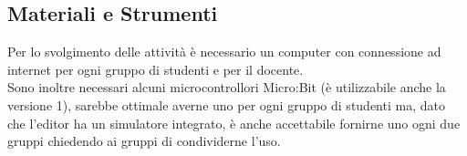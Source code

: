 \documentclass[../../relazione.tex]{subfiles}
\begin{document}
\subsection{Materiali e Strumenti}
Per lo svolgimento delle attività è necessario un computer con connessione ad internet per ogni gruppo di studenti e per il docente.\\
Sono inoltre necessari alcuni microcontrollori Micro:Bit (è utilizzabile anche la versione 1), sarebbe ottimale averne uno per ogni gruppo di studenti ma, dato che l'editor ha un simulatore integrato, è anche accettabile fornirne uno ogni due gruppi chiedendo ai gruppi di condividerne l'uso.
\end{document}
